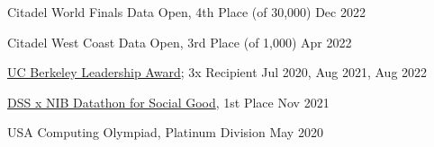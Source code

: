 Citadel World Finals Data Open, 4th Place (of 30,000) \hfill Dec 2022\par
Citadel West Coast Data Open, 3rd Place (of 1,000) \hfill Apr 2022\par
\href{https://alumni.berkeley.edu/community/scholarships/leadership-award}{UC Berkeley Leadership Award}; 3x Recipient \hfill Jul 2020, Aug 2021, Aug 2022 \par
\href{https://www.facebook.com/events/933047190947185?}{DSS x NIB Datathon for Social Good}, 1st Place \hfill Nov 2021\par
USA Computing Olympiad, Platinum Division \hfill May 2020\par